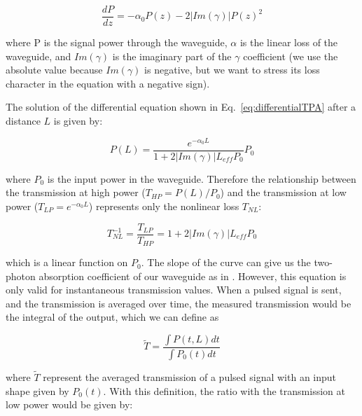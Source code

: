 \documentclass[10pt,letterpaper]{article}
\begin{document}
\begin{equation}
 \frac{dP}{dz} = -\alpha_0 P(z) - 2|Im(\gamma)| P(z)^2 
\label{eq:differentialTPA}
\end{equation}

where P is the signal power through the waveguide, $\alpha$ is the linear loss of the waveguide, and $Im(\gamma)$ is the imaginary part of the $\gamma$ coefficient (we use the absolute value because $Im(\gamma)$ is negative, but we want to stress its loss character in the equation with a negative sign). 

The solution of the differential equation shown in Eq.~\ref{eq:differentialTPA} after a distance $L$ is given by:

\begin{equation}
 P(L) = \frac{e^{-\alpha_0 L}}{1+2|Im(\gamma)| L_{eff} P_0} P_0
\end{equation}

where $P_0$ is the input power in the waveguide. Therefore the relationship between the transmission at high power ($T_{HP} = P(L)/P_0 $) and the transmission at low power ($T_{LP} = e^{-\alpha_0 L} $) represents only the nonlinear loss $T_{NL}$:

\begin{equation}
 T_{NL}^{-1} = \frac{T_{LP}}{T_{HP}} = 1+2|Im(\gamma)| L_{eff} P_0
\label{eq:transmissionLinear}
\end{equation}

which is a linear function on $P_0$. The slope of the curve can give us the two-photon absorption coefficient of our waveguide as in \cite{Vallaitis2009}.
However, this equation is only valid for instantaneous transmission values. When a pulsed signal is sent, and the transmission is averaged over time, the measured transmission would be the integral of the output, which we can define as


\begin{equation}
 \tilde{T}  = \frac{\int P(t,L)dt}{\int P_0(t)dt}
\end{equation}

where $\tilde{T}$ represent the averaged transmission of a pulsed signal with an input shape given by $P_0(t)$. With this definition, the ratio with the transmission at low power would be given by:
\end{document}
